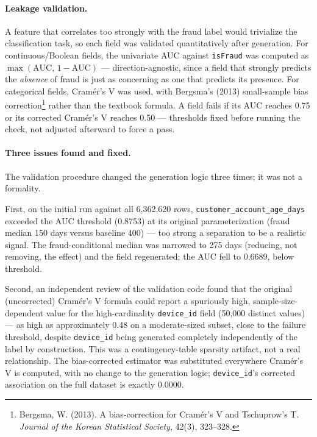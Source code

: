 \paragraph{Leakage validation.} A feature that correlates too strongly with the fraud label would trivialize the classification task, so each field was validated quantitatively after generation. For continuous/Boolean fields, the univariate AUC against \texttt{isFraud} was computed as \(\max(\mathrm{AUC},\, 1-\mathrm{AUC})\) --- direction-agnostic, since a field that strongly predicts the \emph{absence} of fraud is just as concerning as one that predicts its presence. For categorical fields, Cram\'er's V was used, with Bergsma's (2013) small-sample bias correction\footnote{Bergsma, W. (2013). A bias-correction for Cram\'er's V and Tschuprow's T. \emph{Journal of the Korean Statistical Society}, 42(3), 323--328.} rather than the textbook formula. A field fails if its AUC reaches 0.75 or its corrected Cram\'er's V reaches 0.50 --- thresholds fixed before running the check, not adjusted afterward to force a pass.

\paragraph{Three issues found and fixed.} The validation procedure changed the generation logic three times; it was not a formality.

First, on the initial run against all 6,362,620 rows, \texttt{customer\_account\_age\_days} exceeded the AUC threshold (0.8753) at its original parameterization (fraud median 150 days versus baseline 400) --- too strong a separation to be a realistic signal. The fraud-conditional median was narrowed to 275 days (reducing, not removing, the effect) and the field regenerated; the AUC fell to 0.6689, below threshold.

Second, an independent review of the validation code found that the original (uncorrected) Cram\'er's V formula could report a spuriously high, sample-size-dependent value for the high-cardinality \texttt{device\_id} field (50,000 distinct values) --- as high as approximately 0.48 on a moderate-sized subset, close to the failure threshold, despite \texttt{device\_id} being generated completely independently of the label by construction. This was a contingency-table sparsity artifact, not a real relationship. The bias-corrected estimator was substituted everywhere Cram\'er's V is computed, with no change to the generation logic; \texttt{device\_id}'s corrected association on the full dataset is exactly 0.0000.

